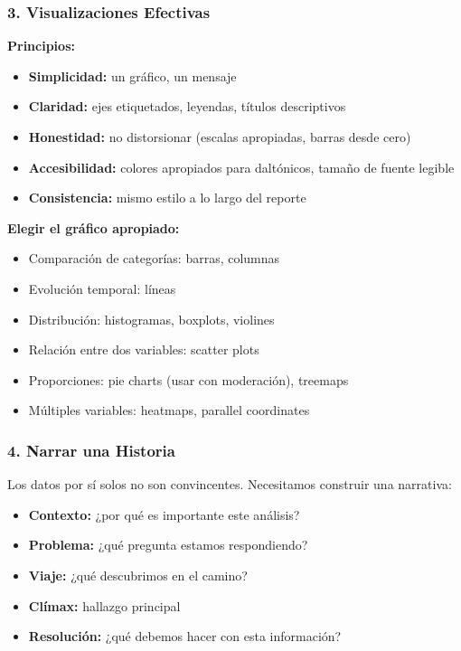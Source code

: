 \documentclass[11pt,a4paper]{article}
\begin{document}
\subsubsection{3. Visualizaciones Efectivas}

\textbf{Principios:}
\begin{itemize}
\item \textbf{Simplicidad:} un gráfico, un mensaje
\item \textbf{Claridad:} ejes etiquetados, leyendas, títulos descriptivos
\item \textbf{Honestidad:} no distorsionar (escalas apropiadas, barras desde cero)
\item \textbf{Accesibilidad:} colores apropiados para daltónicos, tamaño de fuente legible
\item \textbf{Consistencia:} mismo estilo a lo largo del reporte
\end{itemize}

\textbf{Elegir el gráfico apropiado:}
\begin{itemize}
\item Comparación de categorías: barras, columnas
\item Evolución temporal: líneas
\item Distribución: histogramas, boxplots, violines
\item Relación entre dos variables: scatter plots
\item Proporciones: pie charts (usar con moderación), treemaps
\item Múltiples variables: heatmaps, parallel coordinates
\end{itemize}

\subsubsection{4. Narrar una Historia}

Los datos por sí solos no son convincentes. Necesitamos construir una narrativa:

\begin{itemize}
\item \textbf{Contexto:} ¿por qué es importante este análisis?
\item \textbf{Problema:} ¿qué pregunta estamos respondiendo?
\item \textbf{Viaje:} ¿qué descubrimos en el camino?
\item \textbf{Clímax:} hallazgo principal
\item \textbf{Resolución:} ¿qué debemos hacer con esta información?
\end{itemize}
\end{document}
